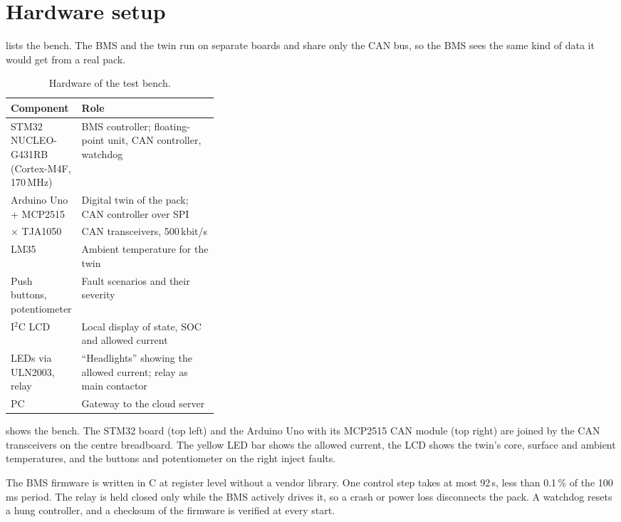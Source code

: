 \chapter{Hardware setup}\label{ch:hardware}

 lists the bench. The BMS and the twin run on separate boards and share only the CAN bus, so the BMS sees the same kind of data it would get from a real pack.

\begin{table}[htbp]\centering\small
\caption{Hardware of the test bench.}\label{tab:hw}
\begin{tabularx}{\linewidth}{@{}>{\raggedright\arraybackslash}p{0.34\linewidth}>{\raggedright\arraybackslash}X@{}}\toprule
Component & Role \\\midrule
STM32 NUCLEO-G431RB (Cortex-M4F, 170\,MHz) & BMS controller; floating-point unit, CAN controller, watchdog \citep{rm0440} \\
Arduino Uno + MCP2515 & Digital twin of the pack; CAN controller over SPI \\
2 $\times$ TJA1050 & CAN transceivers, 500\,kbit/s \citep{tja1050} \\
LM35 & Ambient temperature for the twin \\
Push buttons, potentiometer & Fault scenarios and their severity \\
I$^2$C LCD & Local display of state, SOC and allowed current \\
LEDs via ULN2003, relay & ``Headlights'' showing the allowed current; relay as main contactor \\
PC & Gateway to the cloud server \\\bottomrule
\end{tabularx}
\end{table}

 shows the bench. The STM32 board (top left) and the Arduino Uno with its MCP2515 CAN module (top right) are joined by the CAN transceivers on the centre breadboard. The yellow LED bar shows the allowed current, the LCD shows the twin's core, surface and ambient temperatures, and the buttons and potentiometer on the right inject faults.


The BMS firmware is written in C at register level without a vendor library. One control step takes at most 92\,\textmu s, less than 0.1\,\% of the 100\,ms period. The relay is held closed only while the BMS actively drives it, so a crash or power loss disconnects the pack. A watchdog resets a hung controller, and a checksum of the firmware is verified at every start.
